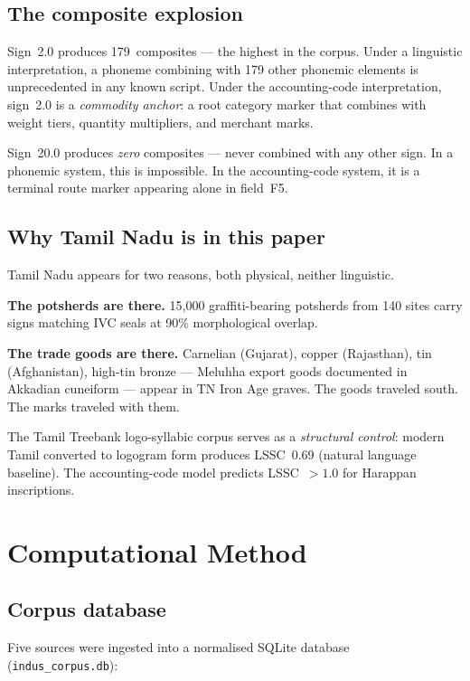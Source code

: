 \subsection{The composite explosion}

Sign~2.0 produces 179~composites --- the highest in the corpus.
Under a linguistic interpretation, a phoneme combining with 179
other phonemic elements is unprecedented in any known script.
Under the accounting-code interpretation, sign~2.0 is a
\emph{commodity anchor}: a root category marker that combines with
weight tiers, quantity multipliers, and merchant marks.

Sign~20.0 produces \emph{zero} composites --- never combined with
any other sign. In a phonemic system, this is impossible.
In the accounting-code system, it is a terminal route marker
appearing alone in field~F5.

\subsection{Why Tamil Nadu is in this paper}

Tamil Nadu appears for two reasons, both physical, neither
linguistic.

\textbf{The potsherds are there.} 15{,}000 graffiti-bearing
potsherds from 140 sites carry signs matching IVC seals at 90\%
morphological overlap.

\textbf{The trade goods are there.} Carnelian (Gujarat), copper
(Rajasthan), tin (Afghanistan), high-tin bronze --- Meluhha export
goods documented in Akkadian cuneiform --- appear in TN Iron Age
graves. The goods traveled south. The marks traveled with them.

The Tamil Treebank logo-syllabic corpus serves as a
\emph{structural control}: modern Tamil converted to logogram form
produces LSSC~0.69 (natural language baseline). The accounting-code
model predicts LSSC~$>1.0$ for Harappan inscriptions.

\section{Computational Method}

\subsection{Corpus database}

Five sources were ingested into a normalised SQLite database
(\texttt{indus\_corpus.db}):

